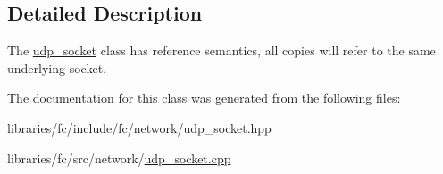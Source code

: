 \subsection{Detailed Description}
The \mbox{\hyperlink{classfc_1_1udp__socket}{udp\+\_\+socket}} class has reference semantics, all copies will refer to the same underlying socket. 

The documentation for this class was generated from the following files\+:\begin{DoxyCompactItemize}
\item 
libraries/fc/include/fc/network/udp\+\_\+socket.\+hpp\item 
libraries/fc/src/network/\mbox{\hyperlink{udp__socket_8cpp}{udp\+\_\+socket.\+cpp}}\end{DoxyCompactItemize}
